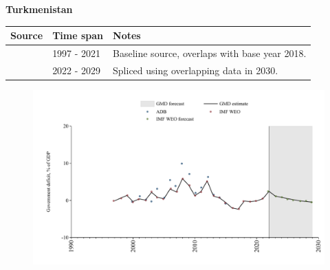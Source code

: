 \documentclass[12pt,a4paper,landscape]{article}
\begin{document}
\begin{adjustbox}{max totalsize={\paperwidth}{\paperheight},center}
\begin{minipage}[t][\textheight][t]{\textwidth}
\vspace*{0.5cm}
{}
\begin{center}
{\Large\bfseries Turkmenistan}
\end{center}
\vspace{0.5cm}
\begin{table}[H]
\centering
\small
\begin{tabular}{|l|l|l|}
\hline
\textbf{Source} & \textbf{Time span} & \textbf{Notes} \\
\hline
\rowcolor{white}\cite{IMF_WEO}& 1997 - 2021 &Baseline source, overlaps with base year 2018.\\
\rowcolor{lightgray}\cite{IMF_WEO_forecast}& 2022 - 2029 &Spliced using overlapping data in 2030.\\
\hline
\end{tabular}
\end{table}
\begin{figure}[H]
\centering
\includegraphics[width=\textwidth,height=0.6\textheight,keepaspectratio]{graphs/TKM_govdef_GDP.pdf}
\end{figure}
\end{minipage}
\end{adjustbox}
\end{document}
